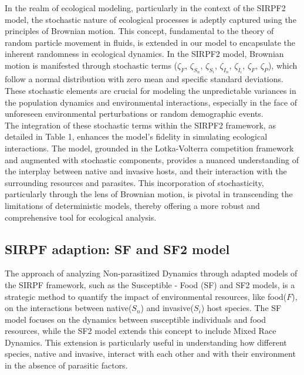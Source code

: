 \documentclass[12pt]{article}
\begin{document}
\renewcommand{\arraystretch}{1}
In the realm of ecological modeling, particularly in the context of the SIRPF2 model, the stochastic nature of ecological processes is adeptly captured using the principles of Brownian motion. This concept, fundamental to the theory of random particle movement in fluids, is extended in our model to encapsulate the inherent randomness in ecological dynamics. In the SIRPF2 model, Brownian motion is manifested through stochastic terms ($\zeta_F$, $\zeta_{S_n}$, $\zeta_{S_i}$, $\zeta_{I_n}$, $\zeta_{I_i}$, $\zeta_{F}$, $\zeta_P$), which follow a normal distribution with zero mean and specific standard deviations. These stochastic elements are crucial for modeling the unpredictable variances in the population dynamics and environmental interactions, especially in the face of unforeseen environmental perturbations or random demographic events.\\

The integration of these stochastic terms within the SIRPF2 framework, as detailed in Table 1, enhances the model's fidelity in simulating ecological interactions. The model, grounded in the Lotka-Volterra competition framework and augmented with stochastic components, provides a nuanced understanding of the interplay between native and invasive hosts, and their interaction with the surrounding resources and parasites. This incorporation of stochasticity, particularly through the lens of Brownian motion, is pivotal in transcending the limitations of deterministic models, thereby offering a more robust and comprehensive tool for ecological analysis.\\

\subsection{SIRPF adaption: SF and SF2 model}

The approach of analyzing Non-parasitized Dynamics through adapted models of the SIRPF framework, such as the Susceptible - Food (SF) and SF2 models, is a strategic method to quantify the impact of environmental resources, like food($F$), on the interactions between native($S_n$) and invasive($S_i$) host species. The SF model focuses on the dynamics between susceptible individuals and food resources, while the SF2 model extends this concept to include Mixed Race Dynamics. This extension is particularly useful in understanding how different species, native and invasive, interact with each other and with their environment in the absence of parasitic factors.\\
\end{document}
